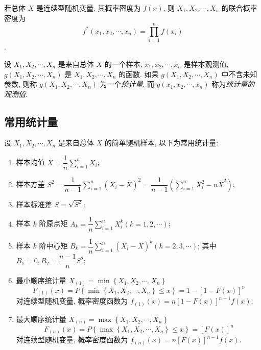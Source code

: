 若总体 $ X $ 是连续型随机变量, 其概率密度为 $ f(x) $, 则 $ X_{1}, X_{2}, \cdots, X_{n} $ 的联合概率密度为 $$ f^{*}\left(x_{1}, x_{2}, \cdots, x_{n}\right)=\prod_{i=1}^{n} f\left(x_{i}\right) $$.

\begin{definition}[统计量与其观测值]
    设 $ X_{1}, X_{2}, \cdots, X_{n} $ 是来自总体 $ X $ 的一个样本, $ x_{1}, x_{2}, \cdots, x_{n} $ 是样本观测值, $ g\left(X_{1}, X_{2}, \cdots, X_{n}\right) $ 是 $ X_{1}, X_{2}, \cdots, X_{n} $ 的函数. 如果 $ g\left(X_{1}, X_{2}, \cdots, X_{n}\right) $ 中不含未知参数, 则称 $ g\left(X_{1}, X_{2}, \cdots, X_{n}\right) $ 为一个\textit{统计量}, 而 $ g\left(x_{1}, x_{2}, \cdots, x_{n}\right) $ 称为\textit{统计量的观测值}.
\end{definition}

\subsection{常用统计量}

\begin{definition}[常用统计量]
    设 $ X_{1}, X_{2}, \cdots, X_{n} $ 是来自总体 $ X $ 的简单随机样本, 以下为常用统计量:
    \begin{enumerate}[label=(\arabic{*})]
        \item 样本均值 $ \bar{X}=\dfrac{1}{n} \displaystyle\sum_{i=1}^{n} X_{i} $;
        \item 样本方差 $S^{2}=\dfrac{1}{n-1} \displaystyle\sum_{i=1}^{n}\left(X_{i}-\bar{X}\right)^{2}=\dfrac{1}{n-1}\left(\displaystyle\sum_{i=1}^{n} X_{i}^{2}-n \bar{X}^{2}\right) $;
        \item 样本标准差 $ S=\sqrt{S^{2}} $;
        \item 样本 $ k $ 阶原点矩 $A_{k}=\dfrac{1}{n} \displaystyle\sum_{i=1}^{n} X_{i}^{k}(k=1,2, \cdots) $;
        \item 样本 $ k $ 阶中心矩 $B_{k}=\dfrac{1}{n} \displaystyle\sum_{i=1}^{n}\left(X_{i}-\bar{X}\right)^{k}(k=2,3, \cdots) $;
        其中 $ B_{1}=0, B_{2}=\dfrac{n-1}{n} S^{2} $;
        \item 最小顺序统计量 $X_{(1)}=\min \left\{X_{1}, X_{2}, \cdots, X_{n}\right\}$
        $$F_{(1)}(x)=P\left\{\min \left\{X_{1}, X_{2}, \cdots, X_{n}\right\} \leqslant x\right\}=1-[1-F(x)]^{n}$$
        对连续型随机变量, 概率密度函数为 $f_{(1)}(x)=n[1-F(x)]^{n-1} f(x) $;
        \item 最大顺序统计量 $X_{(n)}=\max \left\{X_{1}, X_{2}, \cdots, X_{n}\right\}$
        $$F_{(n)}(x)=P\left\{\max \left\{X_{1}, X_{2}, \cdots, X_{n}\right\} \leqslant x\right\}=[F(x)]^{n}$$
        对连续型随机变量, 概率密度函数为 $f_{(n)}(x)=n[F(x)]^{n-1} f(x) .$
    \end{enumerate}
\end{definition}

